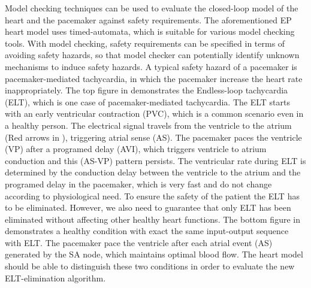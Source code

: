 Model checking techniques can be used to evaluate the closed-loop model of the heart and the pacemaker against safety requirements. The aforementioned EP heart model uses timed-automata, which is suitable for various model checking tools.
With model checking, safety requirements can be specified in terms of avoiding safety hazards, so that model checker can potentially identify unknown mechanisms to induce safety hazards. A typical safety hazard of a pacemaker is pacemaker-mediated tachycardia, in which the pacemaker increase the heart rate inappropriately. The top figure in  demonstrates the Endless-loop tachycardia (ELT), which is one case of pacemaker-mediated tachycardia. The ELT starts with an early ventricular contraction (PVC), which is a common scenario even in a healthy person. The electrical signal travels from the ventricle to the atrium (Red arrows in ), triggering atrial sense (AS). The pacemaker paces the ventricle (VP) after a programed delay (AVI), which triggers ventricle to atrium conduction and this (AS-VP) pattern persists. The ventricular rate during ELT is determined by the conduction delay between the ventricle to the atrium and the programed delay in the pacemaker, which is very fast and do not change according to physiological need. 
To ensure the safety of the patient the ELT has to be eliminated. However, we also need to guarantee that only ELT has been eliminated without affecting other healthy heart functions.
The bottom figure in  demonstrates a healthy condition with exact the same input-output sequence with ELT. The pacemaker pace the ventricle after each atrial event (AS) generated by the SA node, which maintains optimal blood flow. The heart model should be able to distinguish these two conditions in order to evaluate the new ELT-elimination algorithm. 

